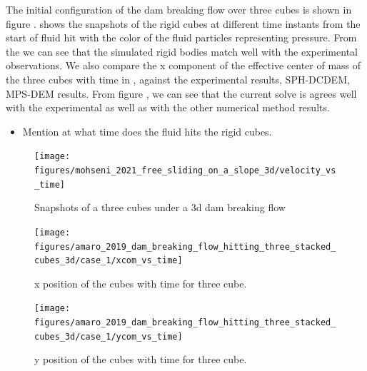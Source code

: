 \documentclass[preprint,12pt]{elsarticle}
\begin{document}
The initial configuration of the dam breaking flow over three cubes is shown
in figure .
 shows the snapshots of
the rigid cubes at different time instants from the start of fluid hit with
the color of the fluid particles representing pressure. From the
 we can see that the
simulated rigid bodies match well with the experimental observations. We also
compare the x component of the effective center of mass of the three cubes
with time in , against
the experimental results, SPH-DCDEM, MPS-DEM results. From figure
, we can see that the
current solve is agrees well with the experimental as well as with the other
numerical method results.
\begin{itemize}
\item Mention at what time does the fluid hits the rigid cubes.
\end{itemize}
\begin{figure}[!htpb]
  \centering
  \texttt{[image: figures/mohseni\_2021\_free\_sliding\_on\_a\_slope\_3d/velocity\_vs\_time]}
  \caption{Snapshots of a three cubes under a 3d dam breaking flow}
\label{fig:snapshots-three-cubes-3d-dam-breaking-flow}
\end{figure}
\begin{figure}[!htpb]
  \centering
  \texttt{[image: figures/amaro\_2019\_dam\_breaking\_flow\_hitting\_three\_stacked\_cubes\_3d/case\_1/xcom\_vs\_time]}
  \caption{x position of the cubes with time for three cube.}
\label{fig:x-position-three-cubes-3d-dam-breaking-flow}
\end{figure}
\begin{figure}[!htpb]
  \centering
  \texttt{[image: figures/amaro\_2019\_dam\_breaking\_flow\_hitting\_three\_stacked\_cubes\_3d/case\_1/ycom\_vs\_time]}
  \caption{y position of the cubes with time for three cube.}
\label{fig:y-position-three-cubes-3d-dam-breaking-flow}
\end{figure}
\end{document}
